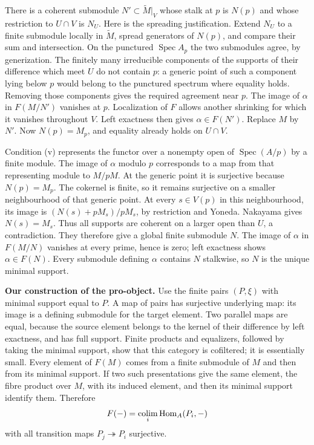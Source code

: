 There is a coherent submodule $N'\subset\widetilde M|_V$ whose stalk
at $p$ is $N(p)$ and whose restriction to $U\cap V$ is $N_U$.
Here is the spreading justification. Extend $N_U$ to a finite submodule
locally in $\widetilde M$, spread generators of $N(p)$, and compare their
sum and intersection. On the punctured $\operatorname{Spec}A_p$ the
two submodules agree, by generization. The finitely many irreducible
components of the supports of their difference which meet $U$ do not
contain $p$: a generic point of such a component lying below $p$ would
belong to the punctured spectrum where equality holds. Removing those
components gives the required agreement near $p$.
The image of $\alpha$ in $F(M/N')$ vanishes at $p$. Localization of
$F$ allows another shrinking for which it vanishes throughout $V$.
Left exactness then gives $\alpha\in F(N')$. Replace $M$ by $N'$.
Now $N(p)=M_p$, and equality already holds on $U\cap V$.

Condition (v) represents the functor over a nonempty open of
$\operatorname{Spec}(A/p)$ by a finite module. The image of
$\alpha$ modulo $p$ corresponds to a map from that representing
module to $M/pM$. At the generic point it is surjective because
$N(p)=M_p$. The cokernel is finite, so it remains surjective on a
smaller neighbourhood of that generic point. At every $s\in V(p)$
in this neighbourhood, its image is
$(N(s)+pM_s)/pM_s$, by restriction and Yoneda. Nakayama gives
$N(s)=M_s$. Thus all supports are coherent on a larger open than $U$,
a contradiction. They therefore give a global finite submodule $N$.
The image of $\alpha$ in $F(M/N)$ vanishes at every prime, hence is
zero; left exactness shows $\alpha\in F(N)$. Every submodule defining
$\alpha$ contains $N$ stalkwise, so $N$ is the unique minimal support.

\textbf{Our construction of the pro-object.} Use the finite pairs
$(P,\xi)$ with minimal support equal to $P$. A map of pairs has
surjective underlying map: its image is a defining submodule for the
target element. Two parallel maps are equal, because the source element
belongs to the kernel of their difference by left exactness, and has
full support. Finite products and equalizers, followed by taking the
minimal support, show that this category is cofiltered; it is essentially
small. Every element of $F(M)$ comes from a finite submodule of $M$
and then from its minimal support. If two such presentations give the
same element, the fibre product over $M$, with its induced element,
and then its minimal support identify them. Therefore
\[
 F(-)=\mathop{\rm colim}_i\operatorname{Hom}_A(P_i,-)
\]
with all transition maps $P_j\twoheadrightarrow P_i$ surjective.

